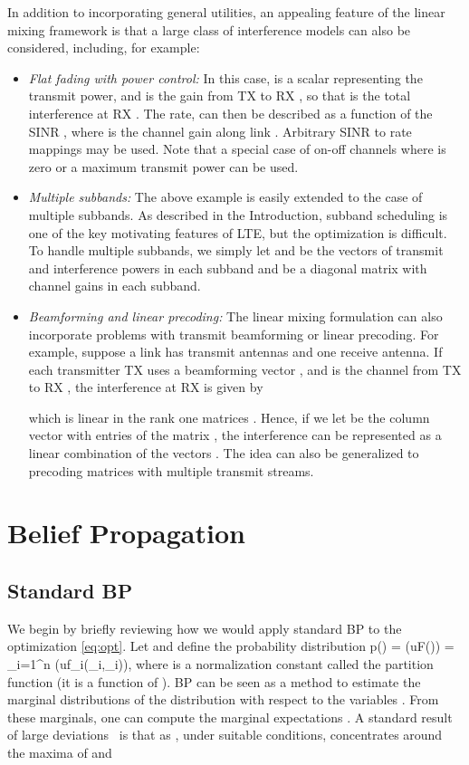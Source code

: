 \documentclass[letterpaper,twocolumn,twoside]{IEEEtran}
\def\beq{}
\newcommand{\xbf}{\mathbf{x}}
\newcommand{\zbf}{\mathbf{z}}
\begin{document}
In addition to incorporating general utilities, an appealing feature of the
linear mixing framework is that a large class of interference models
can also be considered, including, for example:
\begin{itemize}
\item \emph{Flat fading with power control:}  In this case,  is a scalar representing
the transmit power, and  is the gain from TX  to RX , so that  is the
total interference at RX .  The rate,  can then be described
as a function of the SINR , where  is the channel gain along
link .  Arbitrary SINR to rate mappings may be used.
Note that a special case of on-off channels where  is zero or a maximum
transmit power can be used.


\item \emph{Multiple subbands:}  The above example is easily extended to the
case of multiple subbands.  As described in the Introduction, subband scheduling
is one of the key motivating features of LTE, but the optimization is difficult.
To handle multiple subbands, we simply let  and  be the vectors
of transmit  and interference powers in each subband
and  be a diagonal matrix with channel gains in each subband.

\item \emph{Beamforming and linear precoding:}  The linear mixing formulation
can also incorporate problems with transmit beamforming or linear
precoding.  For example, suppose a link has
 transmit antennas and one receive antenna.
If each transmitter TX  uses a beamforming vector ,
and  is the channel from TX  to RX ,
the interference at RX  is given by

which is linear in the rank one matrices .
Hence, if we let  be the column vector with entries
of the matrix , the interference  can be represented
as a linear combination of the vectors .
The idea can also be generalized to precoding matrices with
multiple transmit streams.
\end{itemize}


\section{Belief Propagation} \label{sec:BpAlgo}

\subsection{Standard BP} \label{sec:stdBP}
We begin by briefly reviewing how we would apply standard BP
 to the optimization \eqref{eq:opt}.
Let  and define the probability distribution \beq
\label{eq:probF}
    p(\xbf) =  \exp(uF(\xbf)) =  \prod_{i=1}^n
        \exp(uf_i(\xbf_i,\zbf_i)),
\eeq where  is a normalization constant called the partition
function (it is a function of ).  BP can be seen as a method to
estimate the marginal distributions of the distribution 
with respect to the variables . From these marginals, one
can compute the marginal expectations . A standard result of large deviations~\cite{DemboZ:98}
 is that as ,
 under suitable conditions,  concentrates around the
maxima of  and
\end{document}
